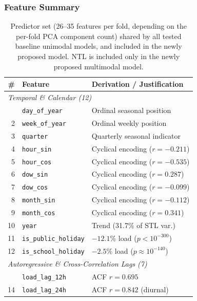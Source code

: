 \subsubsection{Feature Summary}
\label{subsubsec:feature_summary}

\begin{table}[htbp]
\centering
\caption{Predictor set (26--35 features per fold, depending on the per-fold
PCA component count) shared by all tested baseline unimodal models, and
included in the newly proposed model. NTL is included only in the newly
proposed multimodal model.}
\label{tab:36_features}
\footnotesize
\begin{tabularx}{\columnwidth}{r l X}
\toprule
\textbf{\#} & \textbf{Feature} & \textbf{Derivation / Justification} \\
\midrule
\multicolumn{3}{l}{\textit{Temporal \& Calendar (12)}} \\
\addlinespace[2pt]
1  & \texttt{day\_of\_year}       & Ordinal seasonal position \\
2  & \texttt{week\_of\_year}      & Ordinal weekly position \\
3  & \texttt{quarter}             & Quarterly seasonal indicator \\
4  & \texttt{hour\_sin}           & Cyclical encoding ($r = -0.211$) \\
5  & \texttt{hour\_cos}           & Cyclical encoding ($r = -0.535$) \\
6  & \texttt{dow\_sin}            & Cyclical encoding ($r = 0.287$) \\
7  & \texttt{dow\_cos}            & Cyclical encoding ($r = -0.099$) \\
8  & \texttt{month\_sin}          & Cyclical encoding ($r = -0.112$) \\
9  & \texttt{month\_cos}          & Cyclical encoding ($r = 0.341$) \\
10 & \texttt{year}                & Trend (31.7\% of STL var.) \\
11 & \texttt{is\_public\_holiday} & $-12.1$\% load ($p < 10^{-300}$) \\
12 & \texttt{is\_school\_holiday} & $-2.5$\% load ($p \approx 10^{-140}$) \\
\midrule
\multicolumn{3}{l}{\textit{Autoregressive \& Cross-Correlation Lags (7)}} \\
\addlinespace[2pt]
13 & \texttt{load\_lag\_12h}        & ACF $r = 0.695$ \\
14 & \texttt{load\_lag\_24h}        & ACF $r = 0.842$ (diurnal) \\

\end{tabularx}
\end{table}
